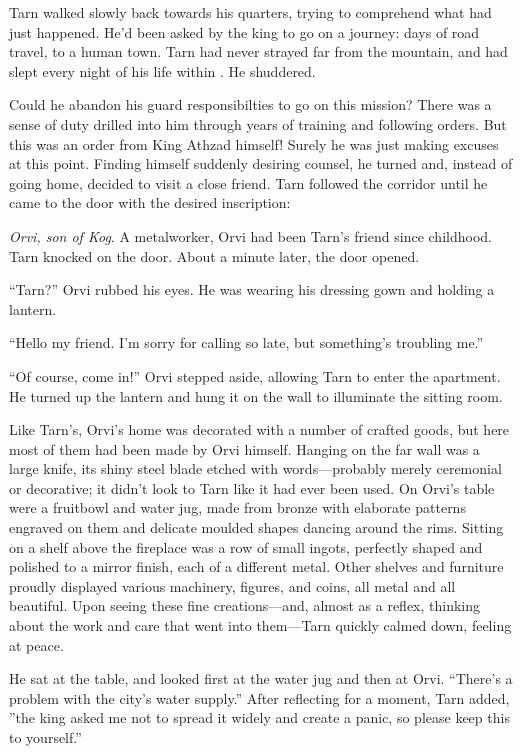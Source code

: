 
Tarn walked slowly back towards his quarters, trying to comprehend what had just happened.  He'd been asked by the king to go on a journey: days of road travel, to a human town.  Tarn had never strayed far from the mountain, and had slept every night of his life within \korbarthrond.  He shuddered.

Could he abandon his guard responsibilties to go on this mission?  There was a sense of duty drilled into him through years of training and following orders.  But this was an order from King Athzad himself!  Surely he was just making excuses at this point.  Finding himself suddenly desiring counsel, he turned and, instead of going home, decided to visit a close friend.  Tarn followed the corridor until he came to the door with the desired inscription:


\emph{Orvi, son of Kog}.  A metalworker, Orvi had been Tarn's friend since childhood.  Tarn knocked on the door.  About a minute later, the door opened.

``Tarn?''  Orvi rubbed his eyes.  He was wearing his dressing gown and holding a lantern.

``Hello my friend.  I'm sorry for calling so late, but something's troubling me.''

``Of course, come in!''  Orvi stepped aside, allowing Tarn to enter the apartment.  He turned up the lantern and hung it on the wall to illuminate the sitting room.

Like Tarn's, Orvi's home was decorated with a number of crafted goods, but here most of them had been made by Orvi himself.  Hanging on the far wall was a large knife, its shiny steel blade etched with words---probably merely ceremonial or decorative; it didn't look to Tarn like it had ever been used.  On Orvi's table were a fruitbowl and water jug, made from bronze with elaborate patterns engraved on them and delicate moulded shapes dancing around the rims.   Sitting on a shelf above the fireplace was a row of small ingots, perfectly shaped and polished to a mirror finish, each of a different metal.  Other shelves and furniture proudly displayed various machinery, figures, and coins, all metal and all beautiful.  Upon seeing these fine creations---and, almost as a reflex, thinking about the work and care that went into them---Tarn quickly calmed down, feeling at peace.

He sat at the table, and looked first at the water jug and then at Orvi.  ``There's a problem with the city's water supply.''  After reflecting for a moment, Tarn added, ''the king asked me not to spread it widely and create a panic, so please keep this to yourself.''

